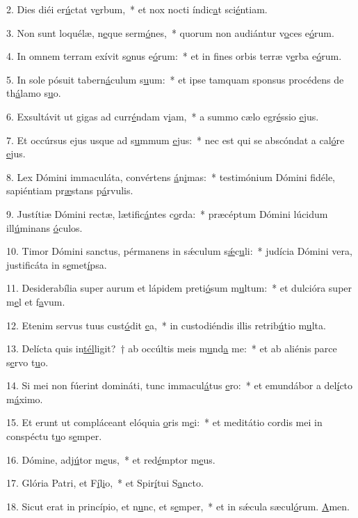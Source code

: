 2. Dies diéi er\uline{ú}ctat v\uline{e}rbum,~* et nox nocti índic\uline{a}t sci\uline{é}ntiam.\par 
3. Non sunt loquélæ, n\uline{e}que serm\uline{ó}nes,~* quorum non audiántur v\uline{o}ces e\uline{ó}rum.\par 
4. In omnem terram exívit s\uline{o}nus e\uline{ó}rum:~* et in fines orbis terræ v\uline{e}rba e\uline{ó}rum.\par 
5. In sole pósuit tabern\uline{á}culum s\uline{u}um:~* et ipse tamquam sponsus procédens de th\uline{á}lamo s\uline{u}o.\par 
6. Exsultávit ut gigas ad curr\uline{é}ndam v\uline{i}am,~* a summo cælo egr\uline{é}ssio \uline{e}jus.\par 
7. Et occúrsus ejus usque ad s\uline{u}mmum \uline{e}jus:~* nec est qui se abscóndat a cal\uline{ó}re \uline{e}jus.\par 
8. Lex Dómini immaculáta, convértens \uline{á}n\uline{i}mas:~* testimónium Dómini fidéle, sapiéntiam pr\uline{æ}stans p\uline{á}rvulis.\par 
9. Justítiæ Dómini rectæ, lætific\uline{á}ntes c\uline{o}rda:~* præcéptum Dómini lúcidum ill\uline{ú}minans \uline{ó}culos.\par 
10. Timor Dómini sanctus, pérmanens in sǽculum s\uline{ǽ}c\uline{u}li:~* judícia Dómini vera, justificáta in s\uline{e}met\uline{í}psa.\par 
11. Desiderabília super aurum et lápidem preti\uline{ó}sum m\uline{u}ltum:~* et dulcióra super m\uline{e}l et f\uline{a}vum.\par 
12. Etenim servus tuus cust\uline{ó}dit \uline{e}a,~* in custodiéndis illis retrib\uline{ú}tio m\uline{u}lta.\par 
13. Delícta quis in\uline{tél}ligit?~† ab occúltis meis m\uline{u}nd\uline{a} me:~* et ab aliénis parce s\uline{e}rvo t\uline{u}o.\par 
14. Si mei non fúerint domináti, tunc immacul\uline{á}tus \uline{e}ro:~* et emundábor a del\uline{í}cto m\uline{á}ximo.\par 
15. Et erunt ut compláceant elóquia \uline{o}ris m\uline{e}i:~* et meditátio cordis mei in conspéctu t\uline{u}o s\uline{e}mper.\par 
16. Dómine, adj\uline{ú}tor m\uline{e}us,~* et red\uline{é}mptor m\uline{e}us.\par 
17. Glória Patri, et F\uline{í}l\uline{i}o,~* et Spir\uline{í}tui S\uline{a}ncto.\par 
18. Sicut erat in princípio, et n\uline{u}nc, et s\uline{e}mper,~* et in sǽcula sæcul\uline{ó}rum. \uline{A}men.\par 
